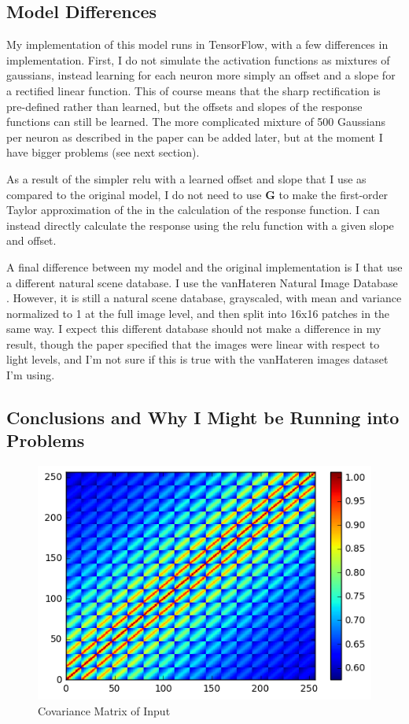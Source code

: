 \documentclass{article}
\begin{document}
\subsection{Model Differences}
My implementation of this model runs in TensorFlow, with a few differences in implementation. First, I do not simulate the activation functions as mixtures of gaussians, instead learning for each neuron more simply an offset and a slope for a rectified linear function. This of course means that the sharp rectification is pre-defined rather than learned, but the offsets and slopes of the response functions can still be learned. The more complicated mixture of 500 Gaussians per neuron as described in the paper can be added later, but at the moment I have bigger problems (see next section). \par
As a result of the simpler relu with a learned offset and slope that I use as compared to the original model, I do not need to use $\textbf{G}$ to make the first-order Taylor approximation of the in the calculation of the response function. I can instead directly calculate the response using the relu function with a given slope and offset. \par
A final difference between my model and the original implementation is I that use a different natural scene database. I use the vanHateren Natural Image Database \cite{VanHateren}. However, it is still a natural scene database, grayscaled, with mean and variance normalized to 1 at the full image level, and then split into 16x16 patches in the same way. I expect this different database should not make a difference in my result, though the paper specified that the images were linear with respect to light levels, and I’m not sure if this is true with the vanHateren images dataset I’m using. \par



\subsection{Conclusions and Why I Might be Running into Problems}

\begin{figure}
  \centering
    \includegraphics[width=1\linewidth]{covx.png}
  \caption{Covariance Matrix of Input}
  \label{fig:covx}
\end{figure}
\end{document}
